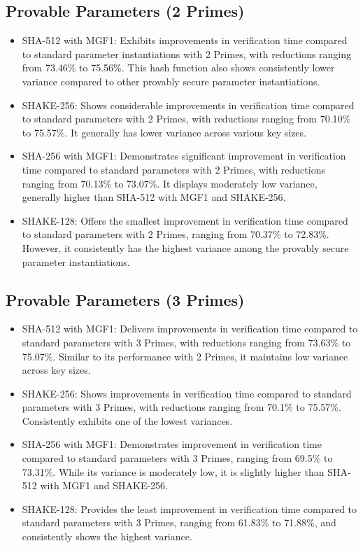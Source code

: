\documentclass[]{final_report}
\theoremstyle{definition}
\begin{document}
\subsection*{Provable Parameters (2 Primes)}
\begin{itemize}
\item SHA-512 with MGF1: Exhibits improvements in verification time compared to standard parameter instantiations with 2 Primes, with reductions ranging from 73.46\% to 75.56\%. This hash function also shows consistently lower variance compared to other provably secure parameter instantiations.
\item SHAKE-256: Shows considerable improvements in verification time compared to standard parameters with 2 Primes, with reductions ranging from 70.10\% to 75.57\%. It generally has lower variance across various key sizes.
\item SHA-256 with MGF1: Demonstrates significant improvement in verification time compared to standard parameters with 2 Primes, with reductions ranging from 70.13\% to 73.07\%. It displays moderately low variance, generally higher than SHA-512 with MGF1 and SHAKE-256.
\item SHAKE-128: Offers the smallest improvement in verification time compared to standard parameters with 2 Primes, ranging from 70.37\% to 72.83\%. However, it consistently has the highest variance among the provably secure parameter instantiations.
\end{itemize}

\subsection*{Provable Parameters (3 Primes)}
\begin{itemize}
\item SHA-512 with MGF1: Delivers improvements in verification time compared to standard parameters with 3 Primes, with reductions ranging from 73.63\% to 75.07\%. Similar to its performance with 2 Primes, it maintains low variance across key sizes.
\item SHAKE-256: Shows improvements in verification time compared to standard parameters with 3 Primes, with reductions ranging from 70.1\% to 75.57\%. Consistently exhibits one of the lowest variances.
\item SHA-256 with MGF1: Demonstrates improvement in verification time compared to standard parameters with 3 Primes, ranging from 69.5\% to 73.31\%. While its variance is moderately low, it is slightly higher than SHA-512 with MGF1 and SHAKE-256.
\item SHAKE-128: Provides the least improvement in verification time compared to standard parameters with 3 Primes, ranging from 61.83\% to 71.88\%, and consistently shows the highest variance.
\end{itemize}
\end{document}
